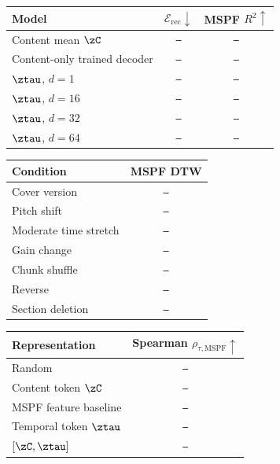 %
%

\providecommand{\res}{\texttt{--}}

\begin{tabular}{lcc}
  \toprule
  \textbf{Model}
  & $\mathcal{E}_{\mathrm{rec}}\downarrow$
  & MSPF $R^2\uparrow$ \\
  \midrule
  Content mean $\zC$ & \res & \res \\
  Content-only trained decoder & \res & \res \\
  \midrule
  $\ztau$, $d=1$ & \res & \res \\
  $\ztau$, $d=16$ & \res & \res \\
  $\ztau$, $d=32$ & \res & \res \\
  $\ztau$, $d=64$ & \res & \res \\
  \bottomrule
\end{tabular}

\begin{tabular}{lc}
  \toprule
  \textbf{Condition} & MSPF DTW \\
  \midrule
  Cover version & \res \\
  Pitch shift & \res \\
  Moderate time stretch & \res \\
  Gain change & \res \\
  Chunk shuffle & \res \\
  Reverse & \res \\
  Section deletion & \res \\
  \bottomrule
\end{tabular}

\begin{tabular}{lc}
  \toprule
  \textbf{Representation}
  & Spearman $\rho_{\tau,\mathrm{MSPF}}\uparrow$ \\
  \midrule
  Random & \res \\
  Content token $\zC$ & \res \\
  MSPF feature baseline & \res \\
  Temporal token $\ztau$ & \res \\
  $[\zC,\ztau]$ & \res \\
  \bottomrule
\end{tabular}

